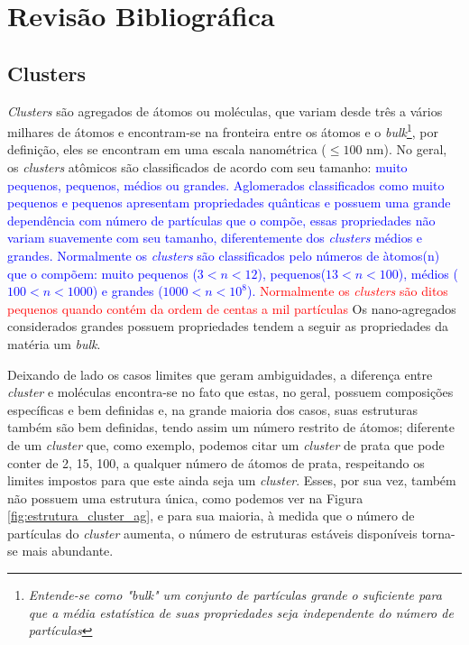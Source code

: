 \chapter{Revisão Bibliográfica}
\label{revisao_bibliografica}

\section{Clusters}
\label{c2-clusters}

\textit{Clusters} são agregados de átomos ou moléculas, que variam desde três a vários milhares de átomos e encontram-se na fronteira entre os átomos e o \textit{bulk}\footnote{\textit{Entende-se como "bulk" um conjunto de partículas grande o suficiente para que a média estatística de suas propriedades seja independente do número de partículas\cite{bulk}}}\cite{Heer,Brack}, por definição, eles se encontram em uma escala nanométrica ($ \leqslant 100$ nm).
No geral, os \textit{clusters} atômicos são classificados de acordo com seu tamanho: \textcolor{blue}{ muito pequenos, pequenos, médios ou grandes. Aglomerados classificados como muito pequenos e pequenos apresentam propriedades quânticas e possuem uma grande dependência com número de partículas que o compõe, essas propriedades não variam suavemente com seu tamanho, diferentemente dos \textit{clusters} médios e grandes.
Normalmente os \textit{clusters} são classificados pelo números de àtomos(n) que o compõem: muito pequenos ($3<n<12$), pequenos($13<n<100$), médios ($100<n<1000$) e grandes ($1000<n<10^8$).}
\textcolor{red}{Normalmente os \textit{clusters} são ditos pequenos quando contém da ordem de centas a mil partículas} Os nano-agregados considerados grandes possuem propriedades tendem a seguir as propriedades da matéria um \textit{bulk}.


Deixando de lado os casos limites que geram ambiguidades, a diferença entre \textit{cluster} e moléculas encontra-se no fato que estas, no geral, possuem composições específicas e bem definidas e, na grande maioria dos casos, suas estruturas também são bem definidas, tendo  assim um número restrito de átomos; diferente de um \textit{cluster} que, como exemplo, podemos citar um \textit{cluster} de prata que pode conter de 2, 15, 100, a qualquer número de átomos de prata, respeitando os limites impostos para que este ainda seja um \textit{cluster}. Esses, por sua vez, também não possuem uma estrutura única, como podemos ver na Figura \ref{fig:estrutura_cluster_ag}, e para sua maioria, à medida que o número de partículas do \textit{cluster} aumenta, o número de estruturas estáveis disponíveis torna-se mais abundante. 

